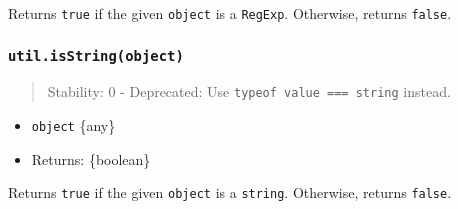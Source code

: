 Returns \texttt{true} if the given \texttt{object} is a \texttt{RegExp}.
Otherwise, returns \texttt{false}.

\begin{Shaded}
\begin{Highlighting}[]
\OperatorTok{=} \NormalTok{(}\NormalTok{)}\OperatorTok{;}

\NormalTok{(}\NormalTok{)}\OperatorTok{;}
\NormalTok{(} \NormalTok{(}\NormalTok{))}\OperatorTok{;}
\NormalTok{(\{\})}\OperatorTok{;}
\end{Highlighting}
\end{Shaded}

\subsubsection{\texorpdfstring{\texttt{util.isString(object)}}{util.isString(object)}}\label{util.isstringobject}

\begin{quote}
Stability: 0 - Deprecated: Use
\texttt{typeof\ value\ ===\ \textquotesingle{}string\textquotesingle{}}
instead.
\end{quote}

\begin{itemize}
\tightlist
\item
  \texttt{object} \{any\}
\item
  Returns: \{boolean\}
\end{itemize}

Returns \texttt{true} if the given \texttt{object} is a \texttt{string}.
Otherwise, returns \texttt{false}.

\begin{Shaded}
\begin{Highlighting}[]
\OperatorTok{=} \NormalTok{(}\NormalTok{)}\OperatorTok{;}

\NormalTok{(}\StringTok{\textquotesingle{}\textquotesingle{}}\NormalTok{)}\OperatorTok{;}
\NormalTok{(}\NormalTok{)}\OperatorTok{;}
\NormalTok{(}\NormalTok{(}\NormalTok{))}\OperatorTok{;}
\NormalTok{(}\NormalTok{)}\OperatorTok{;}
\end{Highlighting}
\end{Shaded}


